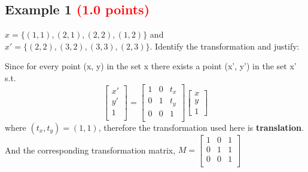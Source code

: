 \documentclass[answers]{exam}
\newcommand{\mypoints}[1]{\textcolor{red}{(#1 points)}}
\begin{document}
\subsection{Example 1 \mypoints{1.0}}
$x = \{(1,1), (2,1), (2,2), (1,2)\}$ and $x' = \{(2,2), (3,2), (3,3), (2,3)\}$. Identify the transformation and justify:
\begin{solution}
Since for every point (x, y) in the set x there exists a point (x', y') in the set x' s.t. \\
$$
\begin{bmatrix} 
x'\\
y'\\
1\\
\end{bmatrix}
=
\begin{bmatrix}
1 & 0 & t_x\\
0 & 1 & t_y\\
0 & 0 & 1\\
\end{bmatrix}
\begin{bmatrix}
x\\
y\\
1
\end{bmatrix}
$$
where $(t_x, t_y) = (1 ,1)$, therefore the transformation used here is \textbf{translation}.\\
And the corresponding transformation matrix,
$M = \begin{bmatrix}
1 & 0 & 1\\
0 & 1 & 1\\
0 & 0 & 1\\
\end{bmatrix}$
\end{solution}
\end{document}
